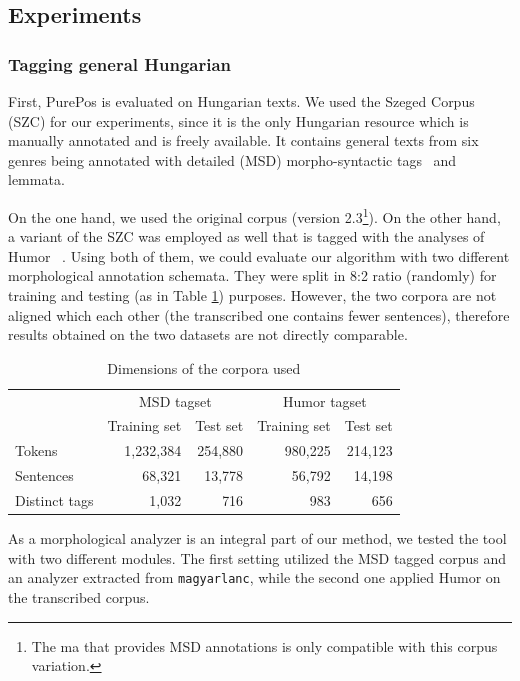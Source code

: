 \subsection{Experiments}

\subsubsection{Tagging general Hungarian}\label{sec:porepos-gen}

First, PurePos is evaluated on Hungarian texts. 
We used the Szeged Corpus~\cite{Csendes2004} (SZC) for our experiments, since it is the only Hungarian resource which is manually annotated and is freely available. 
It contains general texts from six genres being annotated with detailed (MSD) morpho-syntactic tags~\cite{Erjavec2012} and lemmata. 

On the one hand, we used the original corpus (version 2.3\footnote{The \acrshort{ma} that provides MSD annotations is only compatible with this corpus variation.}).
On the other hand, a variant of the SZC was employed as well that is tagged with the analyses of Humor ~\cite{Proszeky1994,Novak2003,Proszeky2005}.
Using both of them, we could evaluate our algorithm with two different morphological annotation schemata.
They were split in 8:2 ratio (randomly) for training and testing (as in Table \ref{tab:szeged-corpus}) purposes. 
However, the two corpora are not aligned which each other (the transcribed one contains fewer sentences), therefore results obtained on the two datasets are not directly comparable.


\begin{table}[H]
\centering
\caption{Dimensions of the corpora used}
\begin{tabular}{l r r r r}
  \hline
  & \multicolumn{2}{c}{MSD tagset} & \multicolumn{2}{c}{Humor tagset} \\
  &  Training set &  Test set &  Training set &  Test set  \\
  \hline
  Tokens &  1,232,384 &  254,880 &  980,225 &  214,123 \\
  Sentences &  68,321 &  13,778 &  56,792 &  14,198 \\
  Distinct tags &  1,032 &  716 &  983 &  656 \\
  \hline
\end{tabular}
\label{tab:szeged-corpus}
\end{table}

As a morphological analyzer is an integral part of our method, we tested the tool with two different modules. 
The first setting utilized the MSD tagged corpus and an analyzer extracted from \texttt{magyarlanc}, while the second one applied Humor on the transcribed corpus.


